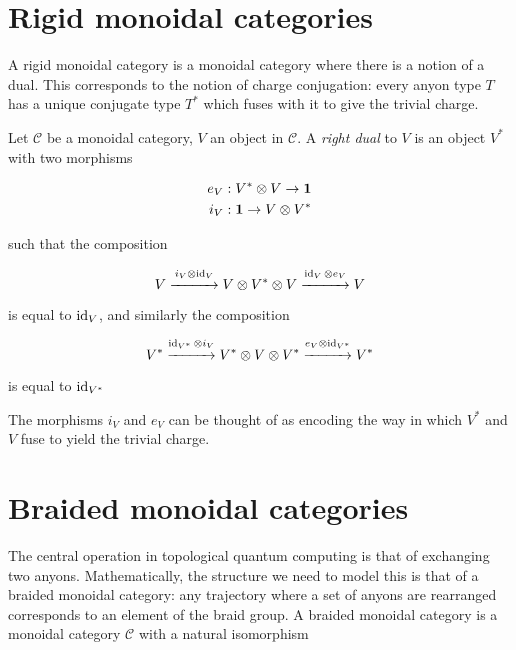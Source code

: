 \section{Rigid monoidal categories}

A rigid monoidal category is a monoidal category where there is a notion of a
dual. This corresponds to the notion of charge conjugation: every anyon type
$T$ has a unique conjugate type $T^*$ which fuses with it to give the trivial
charge.

\begin{defn}
    Let $\mathcal{C}$ be a monoidal category, $V$ an object in $\mathcal{C}$. A
    \emph{right dual} to $V$ is an object $V^*$ with two morphisms

    \begin{align}
        e_V: V^* \otimes V \to \mathbf{1}  \\
        i_V: \mathbf{1} \to V \otimes V^*
    \end{align}
\end{defn}

such that the composition

\begin{equation}
    V \stackrel{ i_V \otimes \operatorname{id}_V }{\xrightarrow{\hspace*{1cm}}} V \otimes V^*
    \otimes V  \stackrel{\operatorname{id}_V \otimes e_V}{\xrightarrow{\hspace*{1cm}}} V
\end{equation}

is equal to $\operatorname{id}_V$, and similarly the composition

\begin{equation}
    V^* \stackrel{\operatorname{id}_{V^*} \otimes i_V}{\xrightarrow{\hspace*{1cm}}} V^*
    \otimes V \otimes V^*  \stackrel{e_V \otimes \operatorname{id}_{V^*}}
    {\xrightarrow{\hspace*{1cm}}} V^*
\end{equation}

is equal to $\operatorname{id}_{V^*}$

The morphisms $i_V$ and $e_V$ can be thought of as encoding the way in which
$V^*$ and $V$ fuse to yield the trivial charge.
   
\section{Braided monoidal categories}
\label{section:Braiding}

The central operation in topological quantum computing is that of exchanging
two anyons. Mathematically, the structure we need to model this is that of a
braided monoidal category: any trajectory where a set of anyons are rearranged
corresponds to
an element of the braid group. A braided monoidal category is a monoidal
category $\mathcal{C}$ with a natural isomorphism

